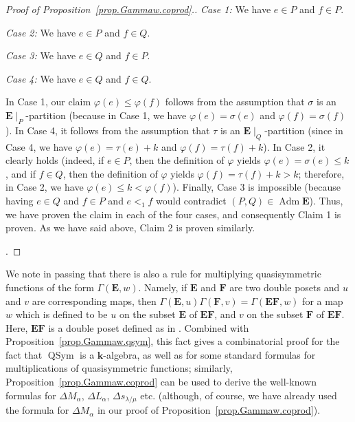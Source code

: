 \documentclass[12pt]{article}
\theoremstyle{plain}
\theoremstyle{definition}
\theoremstyle{remark}
\newcommand{\kk}{{\mathbf{k}}}
\newcommand{\Adm}{\operatorname{Adm}}
\newcommand{\QSym}{{\operatorname{QSym}}}
\newcommand{\EE}{{\mathbf{E}}}
\newcommand{\FF}{{\mathbf{F}}}
\begin{document}
\begin{proof}[Proof of Proposition~\ref{prop.Gammaw.coprod}.]
{\textit{Case 1:} We have $e \in P$ and $f \in P$.

\textit{Case 2:} We have $e \in P$ and $f \in Q$.

\textit{Case 3:} We have $e \in Q$ and $f \in P$.

\textit{Case 4:} We have $e \in Q$ and $f \in Q$.

In Case 1, our claim
$\varphi\left(e\right) \leq \varphi\left(f\right)$ follows
from the assumption that $\sigma$ is an
$\EE\mid_P$-partition (because in Case 1,
we have $\varphi\left(e\right) = \sigma\left(e\right)$
and $\varphi\left(f\right) = \sigma\left(f\right)$).
In Case 4, it follows from the
assumption that $\tau$ is an $\EE\mid_Q$-partition
(since in Case 4, we have
$\varphi\left(e\right) = \tau\left(e\right) + k$ and
$\varphi\left(f\right) = \tau\left(f\right) + k$). In
Case 2, it clearly holds (indeed,
if $e \in P$, then the definition of $\varphi$ yields
$\varphi\left(e\right) = \sigma\left(e\right) \leq k$,
and if $f \in Q$, then
the definition of $\varphi$ yields
$\varphi\left(f\right) = \tau\left(f\right) + k > k$;
therefore, in Case 2, we have
$\varphi\left(e\right) \leq k < \varphi\left(f\right)$).
Finally, Case 3 is impossible (because having $e \in Q$
and $f \in P$ and $e <_1 f$ would contradict
$\left(P, Q\right) \in \Adm \EE$). Thus, we have proven the
claim in each of the four cases, and consequently Claim 1 is
proven. As we have said above, Claim 2 is proven similarly.}.
\end{proof}


We note in passing that there is also a rule for multiplying
quasisymmetric functions of the form $\Gamma\left(\EE, w\right)$.
Namely, if $\EE$ and $\FF$ are two double posets and $u$ and $v$
are corresponding maps, then $\Gamma\left(\EE, u\right)
\Gamma\left(\FF, v\right) = \Gamma\left(\EE \FF, w\right)$ for a
map $w$ which is defined to be $u$ on the subset $\EE$ of
$\EE \FF$, and $v$ on the subset $\FF$ of $\EE \FF$. Here, $\EE \FF$
is a double poset defined as in \cite[\S 2.1]{Mal-Reu-DP}.
Combined with Proposition~\ref{prop.Gammaw.qsym}, this fact gives
a combinatorial proof for the fact that $\QSym$ is a $\kk$-algebra,
as well as for some standard formulas for multiplications of
quasisymmetric functions; similarly,
Proposition~\ref{prop.Gammaw.coprod} can be used to derive the
well-known formulas for $\Delta M_\alpha$, $\Delta L_\alpha$,
$\Delta s_{\lambda / \mu}$ etc. (although, of course, we have
already used the formula for $\Delta M_\alpha$ in our proof of
Proposition~\ref{prop.Gammaw.coprod}).
\end{document}
